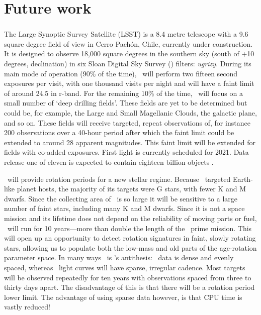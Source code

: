 \chapter{Future work}

\subsection{\LSST}

The Large Synoptic Survey Satellite (LSST) is a 8.4 metre telescope with a 9.6
square degree field of view in Cerro Pach\'{o}n, Chile, currently under
construction.
It is designed to observe 18,000 square degrees in the southern sky (south of
+10 degrees, declination) in six Sloan Digital Sky Survey (\SDSS) filters:
{\it ugrizy}.
During its main mode of operation (90\% of the time), \LSST\ will perform two
fifteen second exposures per visit, with one thousand visits per night and
will have a faint limit of around 24.5 in r-band.
For the remaining 10\% of the time, \LSST\ will focus on a small number of
`deep drilling fields'.
These fields are yet to be determined but could be, for example, the Large and
Small Magellanic Clouds, the galactic plane, and so on.
These fields will receive targeted, repeat observations of, for instance 200
observations over a 40-hour period after which the faint limit could be
extended to around 28 apparent magnitudes.
This faint limit will be extended for fields with co-added exposures.
First light is currently scheduled for 2021.
Data release one of eleven is expected to contain eighteen billion objects
\citep{Ivezic2008}.

\LSST\ will provide rotation periods for a new stellar regime.
Because \kepler\ targeted Earth-like planet hosts, the majority of its
targets were G stars, with fewer K and M dwarfs.
Since the collecting area of \LSST\ is so large it will be sensitive to a
large number of faint stars, including many K and M dwarfs.
Since it is not a space mission and its lifetime does not depend on the
reliability of moving parts or fuel, \LSST\ will run for 10 years---more than
double the length of the \kepler\ prime mission.
This will open up an opportunity to detect rotation signatures in faint,
slowly rotating stars, allowing us to populate both the low-mass and old parts
of the age-rotation parameter space.
In many ways \LSST\ is \kepler's antithesis: \kepler\ data is dense and evenly
spaced, whereas \LSST\ light curves will have sparse, irregular cadence.
Most targets will be observed repeatedly for ten years with observations
spaced from three to thirty days apart.
The disadvantage of this is that there will be a rotation period lower limit.
The advantage of using sparse data however, is that CPU time is vastly
reduced!


